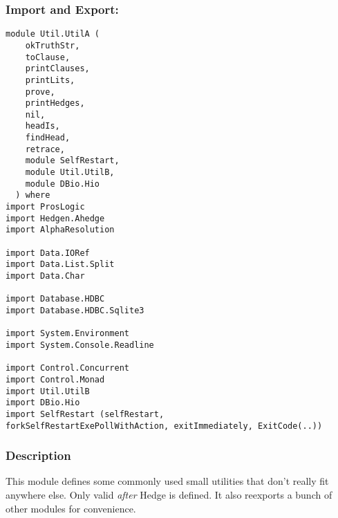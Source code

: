 \documentclass[../gr-final.tex]{subfiles}
\begin{document}
\subsubsection{Import and Export:}
\begin{lstlisting}
module Util.UtilA (
    okTruthStr,
    toClause,
    printClauses,
    printLits,
    prove,
    printHedges,    
    nil,
    headIs,
    findHead,
    retrace,
    module SelfRestart,
    module Util.UtilB, 
    module DBio.Hio
  ) where
import ProsLogic
import Hedgen.Ahedge
import AlphaResolution

import Data.IORef
import Data.List.Split
import Data.Char

import Database.HDBC
import Database.HDBC.Sqlite3

import System.Environment
import System.Console.Readline

import Control.Concurrent
import Control.Monad
import Util.UtilB
import DBio.Hio
import SelfRestart (selfRestart,
forkSelfRestartExePollWithAction, exitImmediately, ExitCode(..))

\end{lstlisting}
\subsubsection{Description}
This module defines some commonly used small utilities that don't
really fit anywhere else. Only valid {\em after} Hedge is
defined. It also reexports a bunch of other modules for
convenience.
\end{document}

